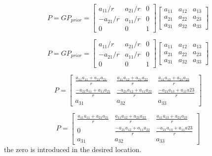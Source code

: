 \documentclass{article}
\begin{document}
\begin{equation}
P = GP_{prior} =
\begin{bmatrix}
a_{11}/r & a_{21}/r & 0\\
-a_{21}/r & a_{11}/r & 0\\
0 & 0 & 1
\end{bmatrix}
\begin{bmatrix}
a_{11} & a_{12} & a_{13}\\
a_{21} & a_{22} & a_{23}\\
a_{31} & a_{32} & a_{33}
\end{bmatrix}
\end{equation}

\begin{equation}
P = GP_{prior} =
\begin{bmatrix}
a_{11}/r & a_{21}/r & 0\\
-a_{21}/r & a_{11}/r & 0\\
0 & 0 & 1
\end{bmatrix}
\begin{bmatrix}
a_{11} & a_{12} & a_{13}\\
a_{21} & a_{22} & a_{23}\\
a_{31} & a_{32} & a_{33}
\end{bmatrix}
\end{equation}

\begin{equation}
P = 
\begin{bmatrix}
\frac{a_{11}a_{11} + a_{21}a_{21}}{r} & \frac{a_{11}a_{12} + a_{21}a_{22}}{r} & \frac{a_{11}a_{13} + a_{21}a_{23}}{r}\\
\frac{-a_{21}a_{11}+ a_{11}a_{21}}{r} & \frac{-a_{21}a_{12} + a_{11}a_{22}}{r} & \frac{-a_{21}a_{13} + a_{11}a{23}}{r} \\
a_{31} & a_{32} & a_{33}
\end{bmatrix}
\end{equation}

\begin{equation}
P = 
\begin{bmatrix}
\frac{a_{11}a_{11} + a_{21}a_{21}}{r} & \frac{a_{11}a_{12} + a_{21}a_{22}}{r} & \frac{a_{11}a_{13} + a_{21}a_{23}}{r}\\
0 & \frac{-a_{21}a_{12} + a_{11}a_{22}}{r} & \frac{-a_{21}a_{13} + a_{11}a{23}}{r} \\
a_{31} & a_{32} & a_{33}
\end{bmatrix}
\end{equation}
the zero is introduced in the desired location.
\end{document}

